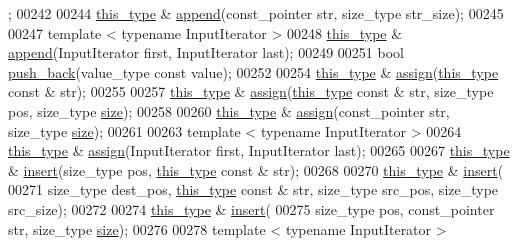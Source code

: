 \begin{DoxyCode}
      ;
00242 
00244     \hyperlink{classhryky_1_1_string}{this_type} & \hyperlink{classhryky_1_1_string_a7b717e6b7a107d6fdc7c0371fa71fcb8}{append}(const\_pointer str, size\_type str\_size);
00245 
00247     \textcolor{keyword}{template} < \textcolor{keyword}{typename} InputIterator >
00248     \hyperlink{classhryky_1_1_string}{this_type} & \hyperlink{classhryky_1_1_string_a7b717e6b7a107d6fdc7c0371fa71fcb8}{append}(InputIterator first, InputIterator last);
00249 
00251     \textcolor{keywordtype}{bool} \hyperlink{classhryky_1_1_string_a0e5eea4617e8a71510a1e34958b0d189}{push_back}(value\_type \textcolor{keyword}{const} value);
00252 
00254     \hyperlink{classhryky_1_1_string}{this_type} & \hyperlink{classhryky_1_1_string_a7bf5bd2385beb66a4d7d034eae00b9b1}{assign}(\hyperlink{classhryky_1_1_string}{this_type} \textcolor{keyword}{const} & str);
00255 
00257     \hyperlink{classhryky_1_1_string}{this_type} & \hyperlink{classhryky_1_1_string_a7bf5bd2385beb66a4d7d034eae00b9b1}{assign}(\hyperlink{classhryky_1_1_string}{this_type} \textcolor{keyword}{const} & str, size\_type pos, size\_type \hyperlink{classhryky_1_1_string_a9db0f71dce7b2de86a54ab5323759265}{size});
00258 
00260     \hyperlink{classhryky_1_1_string}{this_type} & \hyperlink{classhryky_1_1_string_a7bf5bd2385beb66a4d7d034eae00b9b1}{assign}(const\_pointer str, size\_type \hyperlink{classhryky_1_1_string_a9db0f71dce7b2de86a54ab5323759265}{size});
00261 
00263     \textcolor{keyword}{template} < \textcolor{keyword}{typename} InputIterator >
00264     \hyperlink{classhryky_1_1_string}{this_type} & \hyperlink{classhryky_1_1_string_a7bf5bd2385beb66a4d7d034eae00b9b1}{assign}(InputIterator first, InputIterator last);
00265 
00267     \hyperlink{classhryky_1_1_string}{this_type} & \hyperlink{classhryky_1_1_string_a9895ebf2c4792fc2636caf5c6a9b31c3}{insert}(size\_type pos, \hyperlink{classhryky_1_1_string}{this_type} \textcolor{keyword}{const} & str);
00268 
00270     \hyperlink{classhryky_1_1_string}{this_type} & \hyperlink{classhryky_1_1_string_a9895ebf2c4792fc2636caf5c6a9b31c3}{insert}(
00271         size\_type dest\_pos, \hyperlink{classhryky_1_1_string}{this_type} \textcolor{keyword}{const} & str, size\_type src\_pos, size\_type
       src\_size);
00272 
00274     \hyperlink{classhryky_1_1_string}{this_type} & \hyperlink{classhryky_1_1_string_a9895ebf2c4792fc2636caf5c6a9b31c3}{insert}(
00275         size\_type pos, const\_pointer str, size\_type \hyperlink{classhryky_1_1_string_a9db0f71dce7b2de86a54ab5323759265}{size});
00276 
00278     \textcolor{keyword}{template} < \textcolor{keyword}{typename} InputIterator >

\end{DoxyCode}
